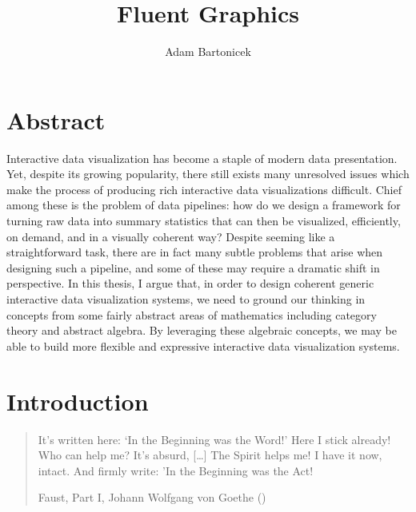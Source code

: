 \documentclass[
]{book}
\title{Fluent Graphics}
\author{Adam Bartonicek}
\date{}
\theoremstyle{definition}
\theoremstyle{definition}
\theoremstyle{definition}
\theoremstyle{definition}
\theoremstyle{remark}
\begin{document}
\maketitle

{
\setcounter{tocdepth}{1}
\tableofcontents
}
\chapter{Abstract}\label{abstract}

Interactive data visualization has become a staple of modern data presentation. Yet, despite its growing popularity, there still exists many unresolved issues which make the process of producing rich interactive data visualizations difficult. Chief among these is the problem of data pipelines: how do we design a framework for turning raw data into summary statistics that can then be visualized, efficiently, on demand, and in a visually coherent way? Despite seeming like a straightforward task, there are in fact many subtle problems that arise when designing such a pipeline, and some of these may require a dramatic shift in perspective. In this thesis, I argue that, in order to design coherent generic interactive data visualization systems, we need to ground our thinking in concepts from some fairly abstract areas of mathematics including category theory and abstract algebra. By leveraging these algebraic concepts, we may be able to build more flexible and expressive interactive data visualization systems.

\newcommand\then{⨾}

\chapter{Introduction}\label{introduction}

\begin{quote}
It's written here: `In the Beginning was the Word!'
Here I stick already! Who can help me? It's absurd,
{[}\ldots{]}
The Spirit helps me! I have it now, intact.
And firmly write: 'In the Beginning was the Act!

Faust, Part I, Johann Wolfgang von Goethe ()
\end{quote}
\end{document}

